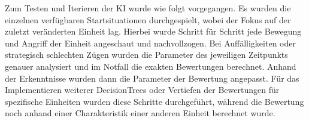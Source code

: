Zum Testen und Iterieren der KI wurde wie folgt vorgegangen. Es wurden die einzelnen verfügbaren Startsituationen durchgespielt, wobei der Fokus auf der zuletzt veränderten Einheit lag. Hierbei wurde Schritt für Schritt jede Bewegung und Angriff der Einheit angeschaut und nachvollzogen. Bei Auffälligkeiten oder strategisch schlechten Zügen wurden die Parameter des jeweiligen Zeitpunkts genauer analysiert und im Notfall die exakten Bewertungen berechnet. Anhand der Erkenntnisse wurden dann die Parameter der Bewertung angepasst. Für das Implementieren weiterer DecisionTrees oder Vertiefen der Bewertungen für spezifische Einheiten wurden diese Schritte durchgeführt, während die Bewertung noch anhand einer Charakteristik einer anderen Einheit berechnet wurde. 


